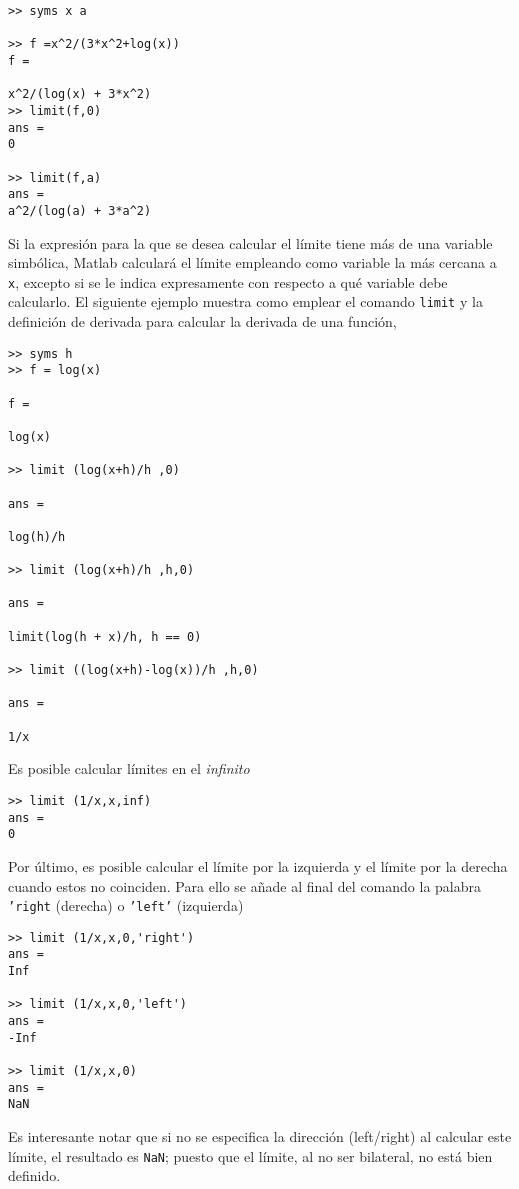 \begin{verbatim}
>> syms x a

>> f =x^2/(3*x^2+log(x))
f =
 
x^2/(log(x) + 3*x^2)
>> limit(f,0)
ans = 
0
 
>> limit(f,a) 
ans = 
a^2/(log(a) + 3*a^2)

\end{verbatim}
Si la expresión para la que se desea calcular el límite tiene más de una variable simbólica, Matlab calculará el límite empleando como variable la más cercana a \texttt{x}, excepto si se le indica expresamente con respecto a qué variable debe calcularlo. El siguiente ejemplo muestra como emplear el comando \texttt{limit} y la definición de derivada para calcular la derivada de una función,

\begin{verbatim} 
>> syms h 
>> f = log(x)
 
f =
 
log(x)
 
>> limit (log(x+h)/h ,0)
 
ans =
 
log(h)/h
 
>> limit (log(x+h)/h ,h,0)
 
ans =
 
limit(log(h + x)/h, h == 0)
 
>> limit ((log(x+h)-log(x))/h ,h,0)
 
ans =
 
1/x
\end{verbatim}

Es posible calcular límites en el \emph{infinito}
\begin{verbatim}
>> limit (1/x,x,inf) 
ans = 
0
\end{verbatim}

Por último, es posible calcular el límite por la izquierda y el límite por la derecha cuando estos no coinciden. Para ello se añade al final del comando la palabra \texttt{'right} (derecha) o \texttt{'left'} (izquierda)
\begin{verbatim}
>> limit (1/x,x,0,'right') 
ans = 
Inf
 
>> limit (1/x,x,0,'left') 
ans = 
-Inf
 
>> limit (1/x,x,0) 
ans = 
NaN
\end{verbatim}
Es interesante notar que si no se especifica la dirección (left/right) al calcular este límite, el resultado es \texttt{NaN}; puesto que el límite, al no ser bilateral, no está bien definido.

